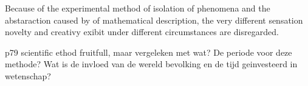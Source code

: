 Because of the experimental method of isolation of phenomena and the abstaraction caused by of mathematical description, the very different sensation novelty and creativy exibit under different circumstances are disregarded.

p79 scientific ethod fruitfull, maar vergeleken met wat? De periode voor deze methode? Wat is de invloed van de wereld bevolking en de tijd geinvesteerd in wetenschap?





















